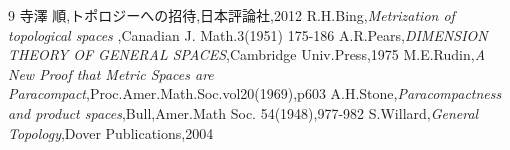 \documentclass[leqno]{jsarticle}
\begin{document}
\begin{thebibliography}{9}
寺澤 順,トポロジーへの招待,日本評論社,2012
R.H.Bing,{\it Metrization of topological spaces },Canadian J. Math.3(1951) 175-186
A.R.Pears,{\it DIMENSION THEORY OF GENERAL SPACES},Cambridge Univ.Press,1975
M.E.Rudin,{\it A New Proof that Metric Spaces are Paracompact},Proc.Amer.Math.Soc.vol20(1969),p603
A.H.Stone,{\it Paracompactness and product spaces},Bull,Amer.Math Soc. 54(1948),977-982
S.Willard,{\it General Topology},Dover Publications,2004
\end{thebibliography}



			
\end{document}
